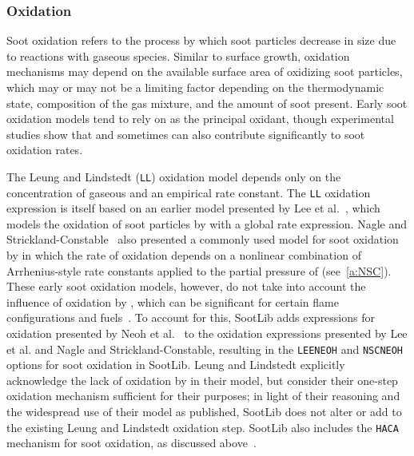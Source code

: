 \documentclass[preprint,letterpaper]{elsarticle}
\begin{document}
\subsubsection{Oxidation}
\label{sss:oxi}

Soot oxidation refers to the process by which soot particles decrease in size due to reactions with gaseous species. Similar to surface growth, oxidation mechanisms may depend on the available surface area of oxidizing soot particles, which may or may not be a limiting factor depending on the thermodynamic state, composition of the gas mixture, and the amount of soot present. Early soot oxidation models tend to rely on  as the principal oxidant, though experimental studies show that  and sometimes  can also contribute significantly to soot oxidation rates.

The Leung and Lindstedt ({\texttt{LL}}) oxidation model depends only on the concentration of gaseous  and an empirical rate constant. The \texttt{LL} oxidation expression is itself based on an earlier model presented by Lee et al.~\cite{Lee_1962}, which models the oxidation of soot particles by  with a global rate expression. Nagle and Strickland-Constable~\cite{Nagle_1962} also presented a commonly used model for soot oxidation by  in which the rate of oxidation depends on a nonlinear combination of Arrhenius-style rate constants applied to the partial pressure of  (see~\ref{a:NSC}). These early soot oxidation models, however, do not take into account the influence of oxidation by , which can be significant for certain flame configurations and fuels~\cite{Neoh_1980}. To account for this, SootLib adds expressions for  oxidation presented by Neoh et al.~\cite{Neoh_1981} to the oxidation expressions presented by Lee et al. and Nagle and Strickland-Constable, resulting in the \texttt{LEE\textunderscore NEOH} and \texttt{NSC\textunderscore NEOH} options for soot oxidation in SootLib. Leung and Lindstedt explicitly acknowledge the lack of oxidation by  in their model, but consider their one-step oxidation mechanism sufficient for their purposes; in light of their reasoning and the widespread use of their model as published, SootLib does not alter or add to the existing Leung and Lindstedt oxidation step. SootLib also includes the \texttt{HACA} mechanism for soot oxidation, as discussed above~\cite{Appel_2000}.

\end{document}
